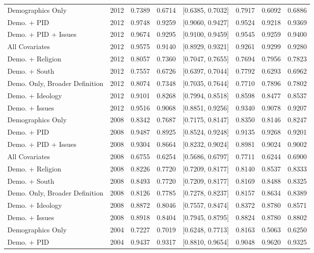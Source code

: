 \begin{longtable}{lrrrlrrr}
  Demographics Only & 2012 & 0.7389 & 0.6714 & [0.6385, 0.7032] & 0.7917 & 0.6092 & 0.6886 \\ 
  Demo. + PID & 2012 & 0.9748 & 0.9259 & [0.9060, 0.9427] & 0.9524 & 0.9218 & 0.9369 \\ 
  Demo. + PID + Issues & 2012 & 0.9674 & 0.9295 & [0.9100, 0.9459] & 0.9545 & 0.9259 & 0.9400 \\ 
  All Covariates & 2012 & 0.9575 & 0.9140 & [0.8929, 0.9321] & 0.9261 & 0.9299 & 0.9280 \\ 
  Demo. + Religion & 2012 & 0.8057 & 0.7360 & [0.7047, 0.7655] & 0.7694 & 0.7956 & 0.7823 \\ 
  Demo. + South & 2012 & 0.7557 & 0.6726 & [0.6397, 0.7044] & 0.7792 & 0.6293 & 0.6962 \\ 
  Demo. Only, Broader Definition & 2012 & 0.8074 & 0.7348 & [0.7035, 0.7644] & 0.7710 & 0.7896 & 0.7802 \\ 
  Demo. + Ideology & 2012 & 0.9101 & 0.8268 & [0.7994, 0.8518] & 0.8598 & 0.8477 & 0.8537 \\ 
  Demo. + Issues & 2012 & 0.9516 & 0.9068 & [0.8851, 0.9256] & 0.9340 & 0.9078 & 0.9207 \\ 
  Demographics Only & 2008 & 0.8342 & 0.7687 & [0.7175, 0.8147] & 0.8350 & 0.8146 & 0.8247 \\ 
  Demo. + PID & 2008 & 0.9487 & 0.8925 & [0.8524, 0.9248] & 0.9135 & 0.9268 & 0.9201 \\ 
  Demo. + PID + Issues & 2008 & 0.9304 & 0.8664 & [0.8232, 0.9024] & 0.8981 & 0.9024 & 0.9002 \\ 
  All Covariates & 2008 & 0.6755 & 0.6254 & [0.5686, 0.6797] & 0.7711 & 0.6244 & 0.6900 \\ 
  Demo. + Religion & 2008 & 0.8226 & 0.7720 & [0.7209, 0.8177] & 0.8140 & 0.8537 & 0.8333 \\ 
  Demo. + South & 2008 & 0.8493 & 0.7720 & [0.7209, 0.8177] & 0.8169 & 0.8488 & 0.8325 \\ 
  Demo. Only, Broader Definition & 2008 & 0.8126 & 0.7785 & [0.7278, 0.8237] & 0.8157 & 0.8634 & 0.8389 \\ 
  Demo. + Ideology & 2008 & 0.8872 & 0.8046 & [0.7557, 0.8474] & 0.8372 & 0.8780 & 0.8571 \\ 
  Demo. + Issues & 2008 & 0.8918 & 0.8404 & [0.7945, 0.8795] & 0.8824 & 0.8780 & 0.8802 \\ 
  Demographics Only & 2004 & 0.7227 & 0.7019 & [0.6248, 0.7713] & 0.8163 & 0.5063 & 0.6250 \\ 
  Demo. + PID & 2004 & 0.9437 & 0.9317 & [0.8810, 0.9654] & 0.9048 & 0.9620 & 0.9325 \\ 

\end{longtable}
